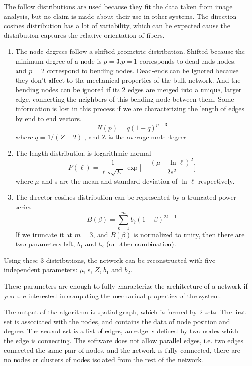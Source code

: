 The follow distributions are used because they fit the data taken from image
analysis, but no claim is made about their use in other systems. The
direction cosines distribution has a lot of variability, which can be expected cause the distribution captures the relative orientation of fibers.
\begin{enumerate} 
\item The node degrees follow a shifted geometric distribution. Shifted because
the minimum degree of a node is $p=3$.$p=1$ corresponds to dead-ends nodes, and
$p=2$ correspond to bending nodes. Dead-ends can be ignored because they don't
affect to the mechanical properties of the bulk network. And the bending nodes
can be ignored if its $2$ edges are merged into a unique, larger edge,
connecting the neighbors of this bending node between them. Some information is lost in this
process if we are characterizing the length of edges by end to end
vectors.
\begin{equation} \label{degree-dist}
N(p)=q(1-q)^{p-3} 
\end{equation}
where $q=1/(Z-2)$ , and Z is the average node degree.
\item The length distribution is logarithmic-normal  
\begin{equation} \label{length-dist}
P(\ell)=\frac{1}{\ell
s\sqrt{2\pi}}\exp{\bigg[-\frac{(\mu-\ln{\ell})^2}{2s^2}\bigg]}
\end{equation}
where $\mu$ and s are the mean and standard deviation of $\ln{\ell}$
respectively.
\item The director cosines distribution can be represented by a truncated power
series.
\begin{equation} \label{cosines-dist}
B(\beta)=\sum_{k=1}^{m} b_k(1-\beta)^{2k-1}
\end{equation}
If we truncate it at $m=3$, and $B(\beta)$ is normalized to unity, then there
are two parameters left, $b_1$ and $b_2$ (or other combination).
\end{enumerate}

Using these $3$ distributions, the network can be reconstructed with five
independent parameters: $\mu$, s, $Z$, $b_1$ and $b_2$.

These parameters are enough to fully characterize the architecture of a
network if you are interested in computing the
mechanical properties of the system.

The output of the algorithm is spatial \gls{graph}, which is formed by $2$
sets. The first set is associated with the nodes, and contains the data of node
position and degree. The second set is a list of edges, an edge is defined
by two nodes which the edge is connecting. The software does not allow parallel
edges, i.e. two edges connected the same pair of nodes, and the network is fully
connected, there are no nodes or clusters of nodes isolated from the rest of the
network.
 
 
